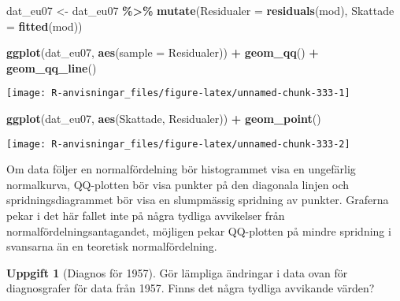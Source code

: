 \documentclass[
]{book}
\newenvironment{Shaded}{\begin{snugshade}}{\end{snugshade}}
\newcommand{\AttributeTok}[1]{\textcolor[rgb]{0.13,0.29,0.53}{#1}}
\newcommand{\FunctionTok}[1]{\textcolor[rgb]{0.13,0.29,0.53}{\textbf{#1}}}
\newcommand{\NormalTok}[1]{#1}
\newcommand{\OtherTok}[1]{\textcolor[rgb]{0.56,0.35,0.01}{#1}}
\newcommand{\SpecialCharTok}[1]{\textcolor[rgb]{0.81,0.36,0.00}{\textbf{#1}}}
\theoremstyle{definition}
\theoremstyle{definition}
\theoremstyle{definition}
\newtheorem{exercise}{Uppgift}[chapter]
\theoremstyle{definition}
\theoremstyle{remark}
\begin{document}
\begin{Shaded}
\begin{Highlighting}[]
\NormalTok{dat\_eu07 }\OtherTok{\textless{}{-}}\NormalTok{ dat\_eu07 }\SpecialCharTok{\%\textgreater{}\%} 
  \FunctionTok{mutate}\NormalTok{(}\AttributeTok{Residualer =} \FunctionTok{residuals}\NormalTok{(mod),}
         \AttributeTok{Skattade =} \FunctionTok{fitted}\NormalTok{(mod))}

\FunctionTok{ggplot}\NormalTok{(dat\_eu07, }\FunctionTok{aes}\NormalTok{(}\AttributeTok{sample =}\NormalTok{ Residualer)) }\SpecialCharTok{+} \FunctionTok{geom\_qq}\NormalTok{() }\SpecialCharTok{+} \FunctionTok{geom\_qq\_line}\NormalTok{()}
\end{Highlighting}
\end{Shaded}

\begin{center}\texttt{[image: R-anvisningar\_files/figure-latex/unnamed-chunk-333-1]} \end{center}

\begin{Shaded}
\begin{Highlighting}[]
\FunctionTok{ggplot}\NormalTok{(dat\_eu07, }\FunctionTok{aes}\NormalTok{(Skattade, Residualer)) }\SpecialCharTok{+} \FunctionTok{geom\_point}\NormalTok{()}
\end{Highlighting}
\end{Shaded}

\begin{center}\texttt{[image: R-anvisningar\_files/figure-latex/unnamed-chunk-333-2]} \end{center}

Om data följer en normalfördelning bör histogrammet visa en ungefärlig normalkurva, QQ-plotten bör visa punkter på den diagonala linjen och spridningsdiagrammet bör visa en slumpmässig spridning av punkter. Graferna pekar i det här fallet inte på några tydliga avvikelser från normalfördelningsantagandet, möjligen pekar QQ-plotten på mindre spridning i svansarna än en teoretisk normalfördelning.

\begin{exercise}[Diagnos för 1957]
Gör lämpliga ändringar i data ovan för diagnosgrafer för data från 1957. Finns det några tydliga avvikande värden?
\end{exercise}
\end{document}
